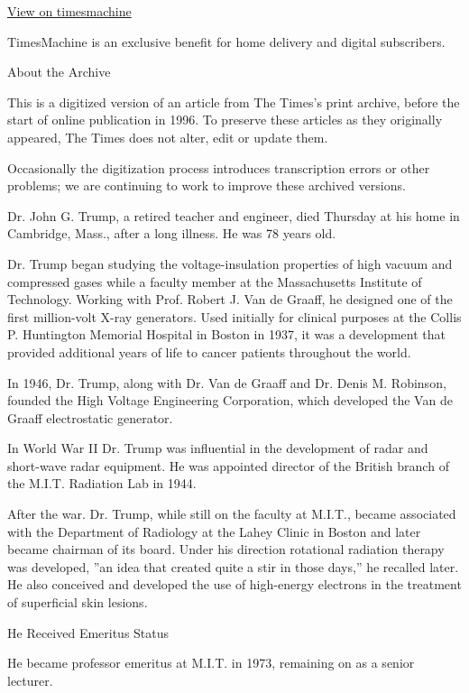 \href{http://timesmachine.nytimes3xbfgragh.onion/timesmachine/1985/02/26/052437.html}{View
on timesmachine}

TimesMachine is an exclusive benefit for home delivery and digital
subscribers.

About the Archive

This is a digitized version of an article from The Times's print
archive, before the start of online publication in 1996. To preserve
these articles as they originally appeared, The Times does not alter,
edit or update them.

Occasionally the digitization process introduces transcription errors or
other problems; we are continuing to work to improve these archived
versions.

Dr. John G. Trump, a retired teacher and engineer, died Thursday at his
home in Cambridge, Mass., after a long illness. He was 78 years old.

Dr. Trump began studying the voltage-insulation properties of high
vacuum and compressed gases while a faculty member at the Massachusetts
Institute of Technology. Working with Prof. Robert J. Van de Graaff, he
designed one of the first million-volt X-ray generators. Used initially
for clinical purposes at the Collis P. Huntington Memorial Hospital in
Boston in 1937, it was a development that provided additional years of
life to cancer patients throughout the world.

In 1946, Dr. Trump, along with Dr. Van de Graaff and Dr. Denis M.
Robinson, founded the High Voltage Engineering Corporation, which
developed the Van de Graaff electrostatic generator.

In World War II Dr. Trump was influential in the development of radar
and short-wave radar equipment. He was appointed director of the British
branch of the M.I.T. Radiation Lab in 1944.

After the war. Dr. Trump, while still on the faculty at M.I.T., became
associated with the Department of Radiology at the Lahey Clinic in
Boston and later became chairman of its board. Under his direction
rotational radiation therapy was developed, ''an idea that created quite
a stir in those days,'' he recalled later. He also conceived and
developed the use of high-energy electrons in the treatment of
superficial skin lesions.

He Received Emeritus Status

He became professor emeritus at M.I.T. in 1973, remaining on as a senior
lecturer.

